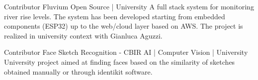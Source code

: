 \begin{cventries}

\cventry
{Contributor} %
{Fluvium} %
{Open Source | University}
{}
{ %
A full stack system for monitoring river rise levels. The system has been developed starting from embedded components (ESP32) up to the web/cloud layer based on AWS. The project is realized in university context with Gianluca Aguzzi.
}


\cventry
{Contributor} %
{Face Sketch Recognition - CBIR} %
{AI | Computer Vision | University}
{}
{ %
University project aimed at finding faces based on the similarity of sketches obtained manually or through identikit software.
}


\end{cventries}
